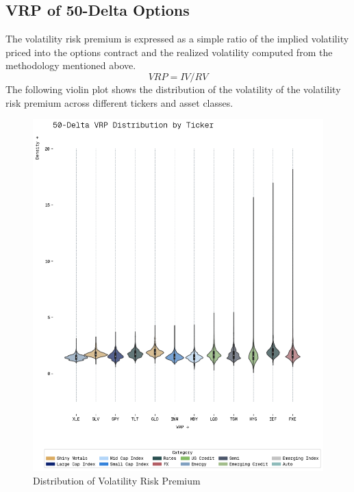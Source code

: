 \subsection{VRP of 50-Delta Options}

The volatility risk premium is expressed as a simple ratio of the implied volatility priced into the options contract and the realized volatility computed from the methodology mentioned above. 
$$ VRP = IV / RV $$
The following violin plot shows the distribution of the volatility of the volatility risk premium across different tickers and asset classes.

\begin{figure}[H]
    \centering
    \includegraphics[width=1\textwidth]{images/atm_vrp_violin.png}
    \caption{Distribution of Volatility Risk Premium}
    \label{fig:atm_vrp_violin}
\end{figure}


